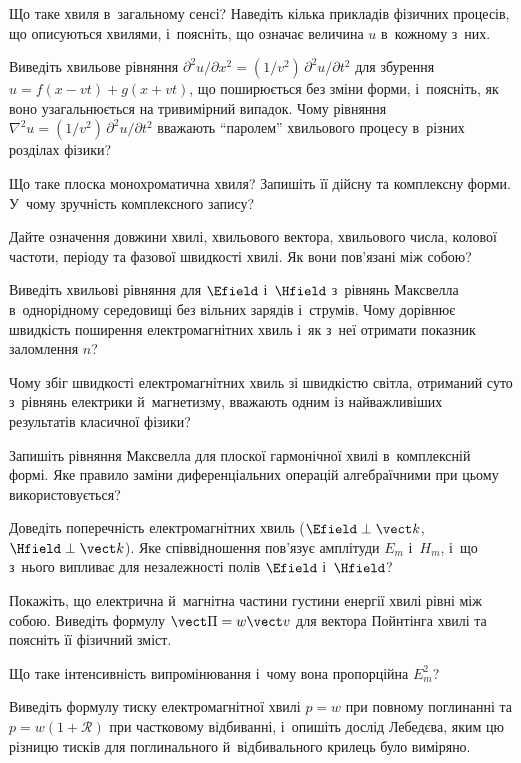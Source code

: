 \begin{Questions}
	\begin{quizlist}
		\item Що таке хвиля в~загальному сенсі? Наведіть кілька прикладів фізичних процесів, що описуються хвилями, і~поясніть, що означає величина $u$ в~кожному з~них.
		\item Виведіть хвильове рівняння $\partial^2u/\partial x^2 = (1/v^2)\,\partial^2u/\partial t^2$ для збурення $u=f(x-vt)+g(x+vt)$, що поширюється без зміни форми, і~поясніть, як воно узагальнюється на тривимірний випадок. Чому рівняння $\nabla^2u = (1/v^2)\,\partial^2u/\partial t^2$ вважають \enquote{паролем} хвильового процесу в~різних розділах фізики?
		\item Що таке плоска монохроматична хвиля? Запишіть її дійсну та комплексну форми. У~чому зручність комплексного запису?
		\item Дайте означення довжини хвилі, хвильового вектора, хвильового числа, колової частоти, періоду та фазової швидкості хвилі. Як вони пов'язані між собою?
		\item Виведіть хвильові рівняння для $\Efield$ і~$\Hfield$ з~рівнянь Максвелла в~однорідному середовищі без вільних зарядів і~струмів. Чому дорівнює швидкість поширення електромагнітних хвиль і~як з~неї отримати показник заломлення $n$?
		\item Чому збіг швидкості електромагнітних хвиль зі швидкістю світла, отриманий суто з~рівнянь електрики й~магнетизму, вважають одним із найважливіших результатів класичної фізики?
		\item Запишіть рівняння Максвелла для плоскої гармонічної хвилі в~комплексній формі. Яке правило заміни диференціальних операцій алгебраїчними при цьому використовується?
		\item Доведіть поперечність електромагнітних хвиль ($\Efield\perp\vect k$, $\Hfield\perp\vect k$). Яке співвідношення пов'язує амплітуди $E_m$ і~$H_m$, і~що з~нього випливає для незалежності полів $\Efield$ і~$\Hfield$?
		\item Покажіть, що електрична й~магнітна частини густини енергії хвилі рівні між собою. Виведіть формулу $\vect\Pi = w\vect v$ для вектора Пойнтінга хвилі та поясніть її фізичний зміст.
		\item Що таке інтенсивність випромінювання і~чому вона пропорційна $E_m^2$?
		\item Виведіть формулу тиску електромагнітної хвилі $p=w$ при повному поглинанні та $p=w(1+\mathcal R)$ при частковому відбиванні, і~опишіть дослід Лебедєва, яким цю різницю тисків для поглинального й~відбивального крилець було виміряно.

\end{quizlist}
\end{Questions}
